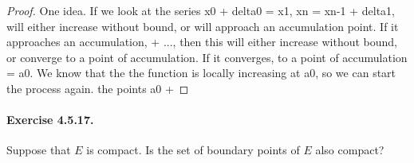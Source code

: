 \documentclass[11pt]{article}
\begin{document}

\begin{proof}
	One idea. If we look at the series x0 + delta0 = x1, xn = xn-1 + delta1, will either increase without bound, or will approach an accumulation point. If it approaches an accumulation,  + ..., then this will either increase without bound, or converge to a point of accumulation. If it converges, to a point of accumulation = a0. We know that the the function is locally increasing at a0, so we can start the process again. the points a0 + 
\end{proof}

\def \bacc {B_{acc}}
\def \biso {B_{iso}}
\newtheorem{lemma4517}{Lemma}
\paragraph{Exercise 4.5.17.} Suppose that $E$ is compact. Is the set of boundary points of $E$ also compact? \newline
\end{document}
